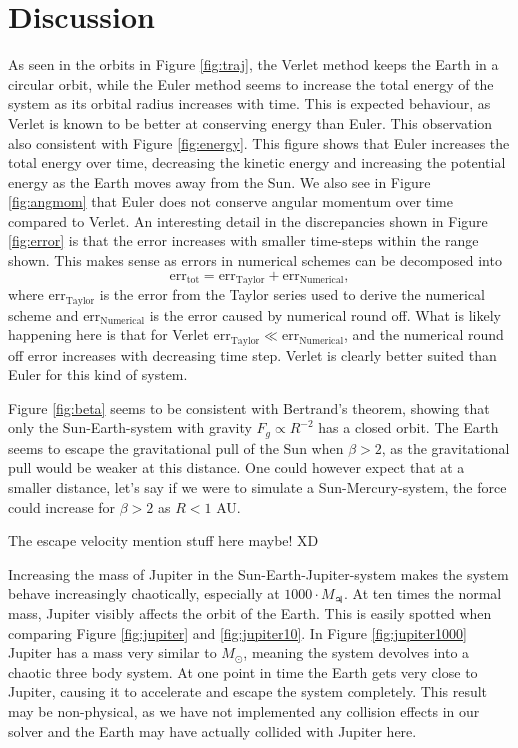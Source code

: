 \documentclass[twocolumn]{aastex62}
\begin{document}
\section{Discussion} \label{sec:discussion}
As seen in the orbits in Figure \ref{fig:traj}, the Verlet method 
keeps the Earth in a circular orbit, while the Euler method seems to 
increase the total energy of the system as its orbital radius increases 
with time. This is expected behaviour, as Verlet is known to be better
at conserving energy than Euler. This observation also consistent with 
Figure \ref{fig:energy}. This figure shows that 
Euler increases the total energy over time, decreasing the kinetic energy
and increasing the potential energy as the Earth moves away from the Sun. 
We also see in Figure \ref{fig:angmom} that Euler does not conserve angular 
momentum over time compared to Verlet.
An interesting detail in the discrepancies shown in Figure \ref{fig:error}
is that the error increases with smaller time-steps within the range 
shown. This makes sense as errors in numerical schemes can be decomposed 
into \begin{equation}
\mathrm{err}_\mathrm{tot}=\mathrm{err}_\mathrm{Taylor} + \mathrm{err}_
\mathrm{Numerical}, \label{eq:error_decomp}
\end{equation} where $\mathrm{err}_\mathrm{Taylor}$ is the error from the 
Taylor series used to derive the numerical scheme and $\mathrm{err}_
\mathrm{Numerical}$ is the error caused by numerical round off. What is 
likely happening here is that for Verlet 
$\mathrm{err}_\mathrm{Taylor} \ll \mathrm{err}_\mathrm{Numerical}$, 
and the numerical round off error increases with decreasing time step. 
Verlet is clearly better suited than Euler for this kind of system.

Figure \ref{fig:beta} seems to be consistent with Bertrand's theorem, 
showing that only the Sun-Earth-system with gravity $F_g\propto R^{-2}$ 
has a closed orbit. The Earth seems to escape the gravitational pull of 
the Sun when $\beta>2$, as the gravitational pull would be weaker at 
this distance. One could however expect that at a smaller distance, let's 
say if we were to simulate a Sun-Mercury-system, the force could increase 
for $\beta>2$ as $R<1$ AU.

The escape velocity mention stuff here maybe! XD


Increasing the mass of Jupiter in the Sun-Earth-Jupiter-system makes the 
system behave increasingly chaotically, especially at 
$1000 \cdot M_\mathrm{\jupiter}$. At ten times the normal mass, 
Jupiter visibly affects the orbit of the Earth. This is easily spotted  
when comparing Figure \ref{fig:jupiter} and \ref{fig:jupiter10}. 
In Figure \ref{fig:jupiter1000} Jupiter 
has a mass very similar to $M_\odot$, meaning the system devolves 
into a chaotic three body system. At one point in time the Earth gets 
very close to Jupiter, causing it to accelerate and escape the system 
completely. This result may be non-physical, as we have not implemented 
any collision effects in our solver and the Earth may have actually 
collided with Jupiter here. 
\end{document}
